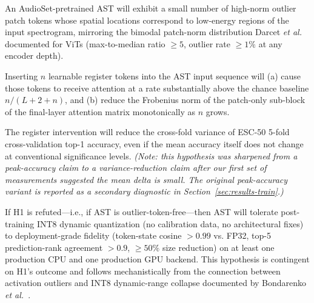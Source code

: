 \documentclass[conference]{IEEEtran}
\begin{document}
\begin{description}[leftmargin=4em,labelindent=0pt,labelsep=0.5em]
\item[\textbf{H1}\rm{ (Artifact Hypothesis).}] An AudioSet-pretrained AST will exhibit a small number of high-norm outlier patch tokens whose spatial locations correspond to low-energy regions of the input spectrogram, mirroring the bimodal patch-norm distribution Darcet \emph{et al.} documented for ViTs (max-to-median ratio $\geq 5$, outlier rate $\geq 1\%$ at any encoder depth).
\item[\textbf{H2}\rm{ (Register-Mechanism Hypothesis).}] Inserting $n$ learnable register tokens into the AST input sequence will (a) cause those tokens to receive attention at a rate substantially above the chance baseline $n/(L+2+n)$, and (b) reduce the Frobenius norm of the patch-only sub-block of the final-layer attention matrix monotonically as $n$ grows.
\item[\textbf{H3}\rm{ (Stability Hypothesis, originally H3 ``Performance Hypothesis'').}] The register intervention will reduce the cross-fold variance of ESC-50 5-fold cross-validation top-1 accuracy, even if the mean accuracy itself does not change at conventional significance levels. \emph{(Note: this hypothesis was sharpened from a peak-accuracy claim to a variance-reduction claim after our first set of measurements suggested the mean delta is small. The original peak-accuracy variant is reported as a secondary diagnostic in Section~\ref{sec:results-train}.)}
\item[\textbf{H4}\rm{ (Quantization-Friendliness Hypothesis).}] If H1 is refuted---i.e., if AST is outlier-token-free---then AST will tolerate post-training INT8 dynamic quantization (no calibration data, no architectural fixes) to deployment-grade fidelity (token-state cosine $> 0.99$ vs. FP32, top-5 prediction-rank agreement $> 0.9$, $\geq 50\%$ size reduction) on at least one production CPU and one production GPU backend. This hypothesis is contingent on H1's outcome and follows mechanistically from the connection between activation outliers and INT8 dynamic-range collapse documented by Bondarenko \emph{et al.}~\cite{bondarenko2023quantizable}.
\end{description}
\end{document}
